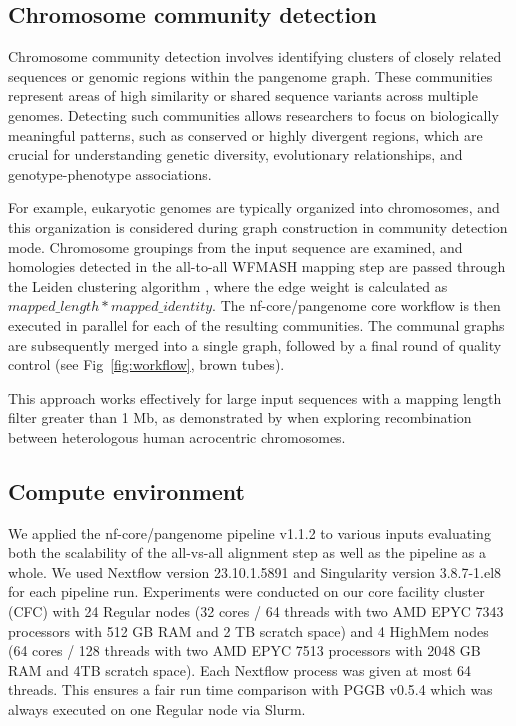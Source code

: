 \documentclass{bioinfo}
\theoremstyle{definition}
\begin{document}
	\subsection{Chromosome community detection}
	\label{community}
	
	Chromosome community detection involves identifying clusters of closely related sequences or genomic regions within the pangenome graph. These communities represent areas of high similarity or shared sequence variants across multiple genomes. Detecting such communities allows researchers to focus on biologically meaningful patterns, such as conserved or highly divergent regions, which are crucial for understanding genetic diversity, evolutionary relationships, and genotype-phenotype associations.
	
	For example, eukaryotic genomes are typically organized into chromosomes, and this organization is considered during graph construction in community detection mode. Chromosome groupings from the input sequence are examined, and homologies detected in the all-to-all WFMASH mapping step are passed through the Leiden clustering algorithm \citep{Traag2019}, where the edge weight is calculated as $mapped\_length * mapped\_identity$. The nf-core/pangenome core workflow is then executed in parallel for each of the resulting communities. The communal graphs are subsequently merged into a single graph, followed by a final round of quality control (see Fig~\ref{fig:workflow}, brown tubes).
	
	This approach works effectively for large input sequences with a mapping length filter greater than 1 Mb, as demonstrated by \cite{Guarracino2023} when exploring recombination between heterologous human acrocentric chromosomes.
	
	\subsection{Compute environment}
	
	We applied the nf-core/pangenome pipeline v1.1.2 to various inputs evaluating both the scalability of the all-vs-all alignment step as well as the pipeline as a whole. 
	We used Nextflow version 23.10.1.5891 and Singularity version 3.8.7-1.el8 for each pipeline run. 
	Experiments were conducted on our core facility cluster (CFC) with 24 Regular nodes (32 cores / 64 threads with two AMD EPYC 7343 processors with 512 GB RAM and 2 TB scratch space) and 4 HighMem nodes (64 cores / 128 threads with two AMD EPYC 7513 processors with 2048 GB RAM and 4TB scratch space). 
	Each Nextflow process was given at most 64 threads. This ensures a fair run time comparison with PGGB v0.5.4 which was always executed on one Regular node via Slurm.
	
\end{document}
